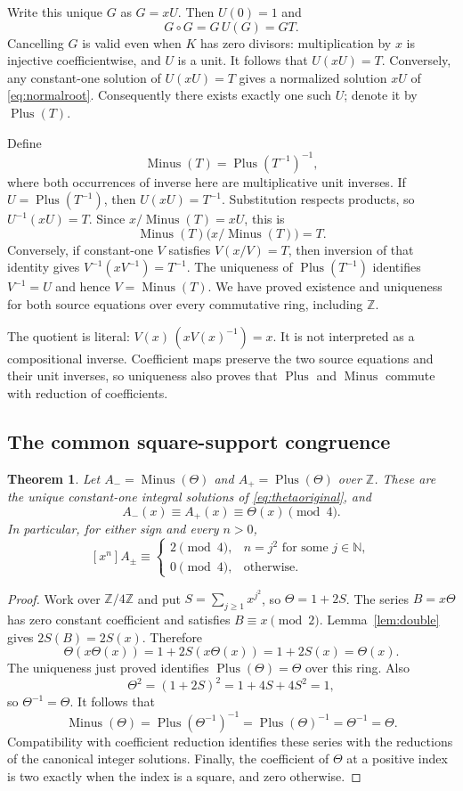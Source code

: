 \documentclass[11pt,a4paper]{article}
\newtheorem{theorem}{Theorem}[section]
\theoremstyle{remark}
\newcommand{\Z}{\mathbb Z}
\newcommand{\N}{\mathbb N}
\newcommand{\Plus}{\operatorname{Plus}}
\newcommand{\Minus}{\operatorname{Minus}}
\begin{document}
Write this unique $G$ as $G=xU$. Then $U(0)=1$ and
\[
 G\circ G=G\,U(G)=GT.
\]
Cancelling $G$ is valid even when $K$ has zero divisors: multiplication by
$x$ is injective coefficientwise, and $U$ is a unit. It follows that
$U(xU)=T$. Conversely, any constant-one solution of $U(xU)=T$ gives a
normalized solution $xU$ of \eqref{eq:normalroot}. Consequently there
exists exactly one such $U$; denote it by $\Plus(T)$.

Define
\[
 \Minus(T)=\Plus(T^{-1})^{-1},
\]
where both occurrences of inverse here are multiplicative unit inverses.
If $U=\Plus(T^{-1})$, then $U(xU)=T^{-1}$.
Substitution respects products, so $U^{-1}(xU)=T$. Since
$x/\Minus(T)=xU$, this is
\[
 \Minus(T)\bigl(x/\Minus(T)\bigr)=T.
\]
Conversely, if constant-one $V$ satisfies $V(x/V)=T$, then inversion of
that identity gives $V^{-1}(xV^{-1})=T^{-1}$. The uniqueness of
$\Plus(T^{-1})$ identifies $V^{-1}=U$ and hence $V=\Minus(T)$.
We have proved existence and uniqueness for both source equations
over every commutative ring, including $\Z$.

The quotient is literal: $V(x)\,(xV(x)^{-1})=x$. It is not interpreted as a
compositional inverse. Coefficient maps preserve the two source equations
and their unit inverses, so uniqueness also proves that $\Plus$ and
$\Minus$ commute with reduction of coefficients.

\subsection{The common square-support congruence}

\begin{theorem}\label{thm:theta}
Let $A_-=\Minus(\Theta)$ and $A_+=\Plus(\Theta)$ over $\Z$.
These are the unique constant-one integral solutions of
\eqref{eq:thetaoriginal}, and
\[
 A_-(x)\equiv A_+(x)\equiv\Theta(x)\pmod4.
\]
In particular, for either sign and every $n>0$,
\[
 [x^n]A_\pm\equiv
 \begin{cases}
  2\pmod4,&n=j^2\text{ for some }j\in\N,\\
  0\pmod4,&\text{otherwise}.
 \end{cases}
\]
\end{theorem}

\begin{proof}
Work over $\Z/4\Z$ and put $S=\sum_{j\ge1}x^{j^2}$, so $\Theta=1+2S$.
The series $B=x\Theta$ has zero constant coefficient and satisfies
$B\equiv x\pmod2$. Lemma~\ref{lem:double} gives $2S(B)=2S(x)$.
Therefore
\[
 \Theta(x\Theta(x))=1+2S(x\Theta(x))=1+2S(x)=\Theta(x).
\]
The uniqueness just proved identifies $\Plus(\Theta)=\Theta$ over this
ring. Also
\[
 \Theta^2=(1+2S)^2=1+4S+4S^2=1,
\]
so $\Theta^{-1}=\Theta$. It follows that
\[
 \Minus(\Theta)=\Plus(\Theta^{-1})^{-1}
 =\Plus(\Theta)^{-1}=\Theta^{-1}=\Theta.
\]
Compatibility with coefficient reduction identifies these series with
the reductions of the canonical integer solutions. Finally, the
coefficient of $\Theta$ at a positive index is two exactly when the
index is a square, and zero otherwise.
\end{proof}
\end{document}
